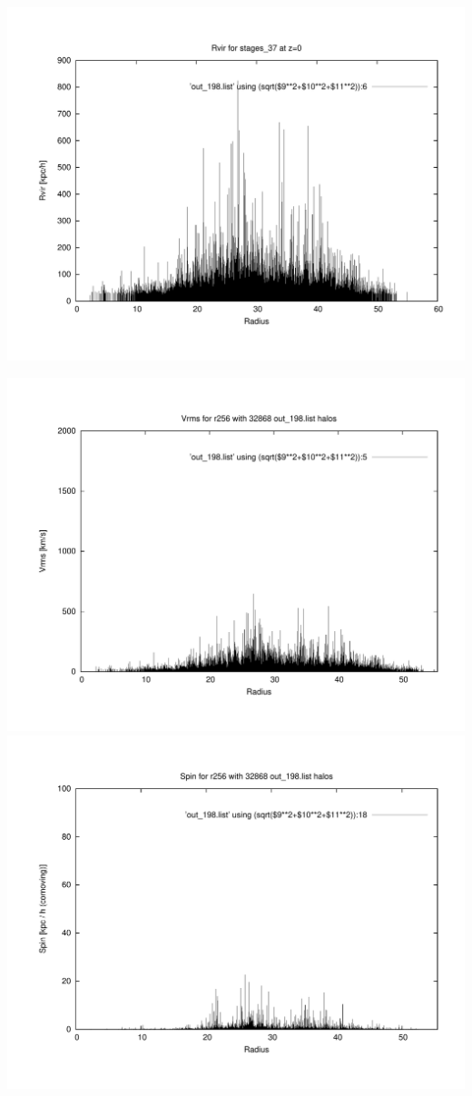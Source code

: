 \includegraphics[scale=0.3]{r256/h100/stages_37/plot_rvir_z0.pdf}

\includegraphics[scale=0.3]{r256/h100/stages_37/plot_Vrms_out_198.pdf}
\includegraphics[scale=0.3]{r256/h100/stages_37/plot_spin_out_198.pdf}

